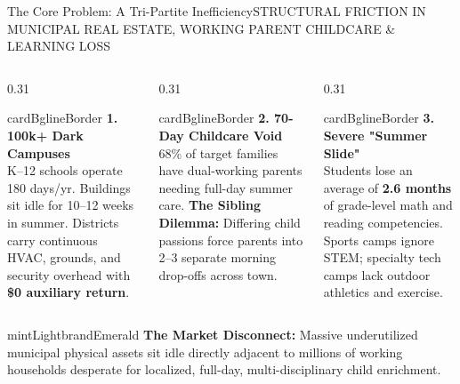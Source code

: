\documentclass[aspectratio=169,9pt]{beamer}
\begin{document}
\begin{frame}{The Core Problem: A Tri-Partite Inefficiency}{STRUCTURAL FRICTION IN MUNICIPAL REAL ESTATE, WORKING PARENT CHILDCARE \& LEARNING LOSS}

\begin{columns}[T]
  \begin{column}{0.31\textwidth}
    \begin{execbox}{cardBg}{lineBorder}
      \textcolor{red!80!black}{\textbf{\scriptsize 1. 100k+ Dark Campuses}} \\[2pt]
      \tiny
      K--12 schools operate 180 days/yr. Buildings sit idle for 10--12 weeks in summer.
      \vskip2pt
      Districts carry continuous HVAC, grounds, and security overhead with \textbf{\$0 auxiliary return}.
    \end{execbox}
  \end{column}

  \begin{column}{0.31\textwidth}
    \begin{execbox}{cardBg}{lineBorder}
      \textcolor{brandAmber}{\textbf{\scriptsize 2. 70-Day Childcare Void}} \\[2pt]
      \tiny
      68\% of target families have dual-working parents needing full-day summer care.
      \vskip2pt
      \textbf{The Sibling Dilemma:} Differing child passions force parents into 2--3 separate morning drop-offs across town.
    \end{execbox}
  \end{column}

  \begin{column}{0.31\textwidth}
    \begin{execbox}{cardBg}{lineBorder}
      \textcolor{brandBlue}{\textbf{\scriptsize 3. Severe "Summer Slide"}} \\[2pt]
      \tiny
      Students lose an average of \textbf{2.6 months} of grade-level math and reading competencies.
      \vskip2pt
      Sports camps ignore STEM; specialty tech camps lack outdoor athletics and exercise.
    \end{execbox}
  \end{column}
\end{columns}

\vskip4pt
\begin{execbox}{mintLight}{brandEmerald}
  \scriptsize
  \textbf{The Market Disconnect:} Massive underutilized municipal physical assets sit idle directly adjacent to millions of working households desperate for localized, full-day, multi-disciplinary child enrichment.
\end{execbox}

\end{frame}
\end{document}

